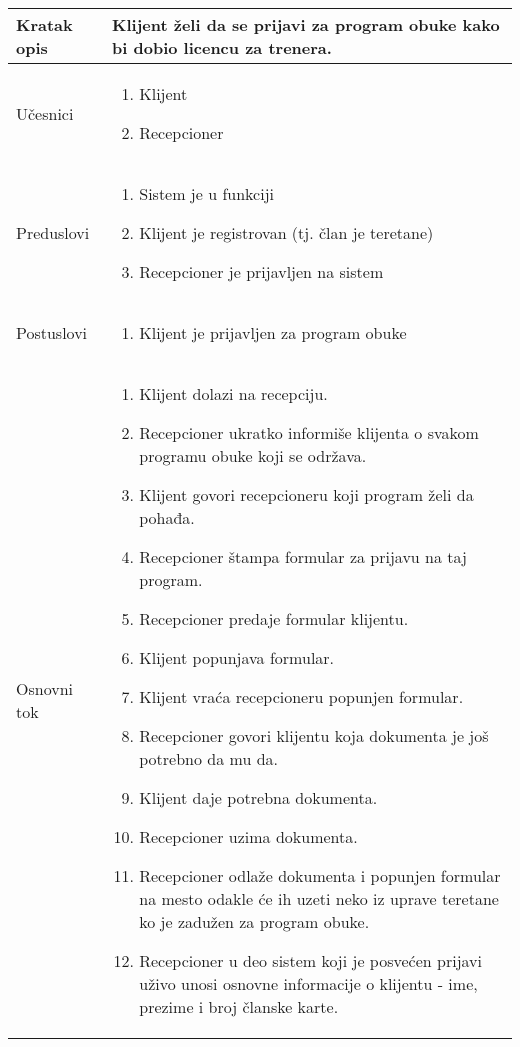 \documentclass[../../main.tex]{subfiles}
\begin{document}
\begin{longtable}{| p{} | p{} |} 
\hline
    Kratak opis & Klijent želi da se prijavi za program obuke kako bi dobio licencu za trenera.  \\ 
\hline    
    Učesnici &
    \begin{enumerate}
        \item Klijent
        \item Recepcioner
    \end{enumerate}\\
\hline
   Preduslovi &
   \begin{enumerate}
        \item Sistem je u funkciji
        \item Klijent je registrovan (tj. član je teretane)
        \item Recepcioner je prijavljen na sistem
    \end{enumerate}\\
\hline  
    Postuslovi & 
    \begin{enumerate}
        \item Klijent je prijavljen za program obuke
    \end{enumerate} \\
\hline
    Osnovni tok & 
    \begin{enumerate}
        \item Klijent dolazi na recepciju.
        \item Recepcioner ukratko informiše klijenta o svakom programu obuke koji se održava.
        \item Klijent govori recepcioneru koji program želi da pohađa.
        \item Recepcioner štampa formular za prijavu na taj program.
        \item Recepcioner predaje formular klijentu.
        \item Klijent popunjava formular.
        \item Klijent vraća recepcioneru popunjen formular.
        \item Recepcioner govori klijentu koja dokumenta je još potrebno da mu da.
        \item Klijent daje potrebna dokumenta.
        \item Recepcioner uzima dokumenta.
        \item Recepcioner odlaže dokumenta i popunjen formular na mesto odakle će ih uzeti neko iz uprave teretane ko je zadužen za program obuke.
        \item Recepcioner u deo sistem koji je posvećen prijavi uživo unosi osnovne informacije o klijentu - ime, prezime i broj članske karte.

\end{enumerate}
\end{longtable}
\end{document}
